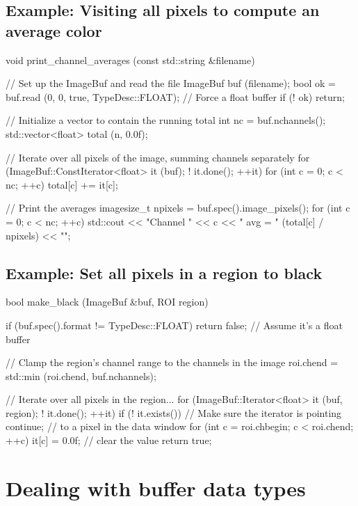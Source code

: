 \subsection*{Example: Visiting all pixels to compute an average color}

\begin{code}
void print_channel_averages (const std::string &filename)
{
    // Set up the ImageBuf and read the file
    ImageBuf buf (filename);
    bool ok = buf.read (0, 0, true, TypeDesc::FLOAT);  // Force a float buffer
    if (! ok)
        return;

    // Initialize a vector to contain the running total
    int nc = buf.nchannels();
    std::vector<float> total (n, 0.0f);

    // Iterate over all pixels of the image, summing channels separately
    for (ImageBuf::ConstIterator<float> it (buf);  ! it.done();  ++it)
        for (int c = 0;  c < nc;  ++c)
            total[c] += it[c];

    // Print the averages
    imagesize_t npixels = buf.spec().image_pixels();
    for (int c = 0;  c < nc;  ++c)
        std::cout << "Channel " << c << " avg = " (total[c] / npixels) << "\n";
}
\end{code}


\subsection*{Example: Set all pixels in a region to black}
\label{makeblackexample}

\begin{code}
bool make_black (ImageBuf &buf, ROI region)
{
    if (buf.spec().format != TypeDesc::FLOAT)
        return false;    // Assume it's a float buffer

    // Clamp the region's channel range to the channels in the image
    roi.chend = std::min (roi.chend, buf.nchannels);

    // Iterate over all pixels in the region...
    for (ImageBuf::Iterator<float> it (buf, region);  ! it.done();  ++it) {
        if (! it.exists())   // Make sure the iterator is pointing
            continue;        //   to a pixel in the data window
        for (int c = roi.chbegin;  c < roi.chend;  ++c)
            it[c] = 0.0f;  // clear the value
    }
    return true;
}
\end{code}


\section{Dealing with buffer data types}

